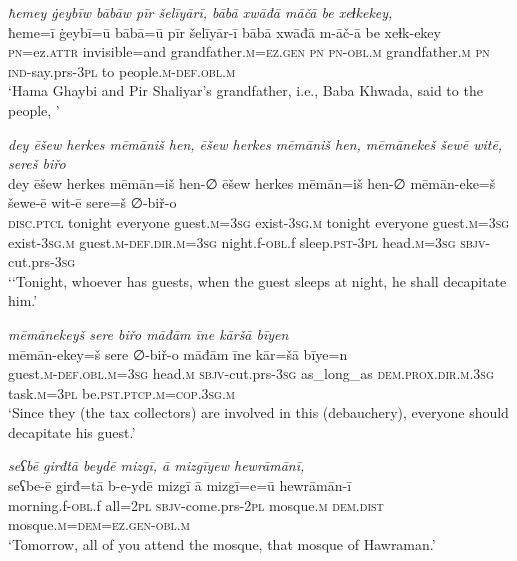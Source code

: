 \ea \label{BP.51}
\textit{ħemey ġeybīw bābāw pīr šelīyārī, bābā xwāđā māčā be xeɫkekey,} \\ 
\gll ħeme=ī ġeybī=ū bābā=ū pīr šelīyār-ī bābā xwāđā m-āč-ā be xeɫk-ekey \\ 
 \textsc{pn}=ez.\textsc{attr} invisible=and grandfather\textsc{.m}\textsc{=ez.gen} \textsc{pn} \textsc{pn}\textsc{-obl}\textsc{.m} grandfather\textsc{.m} \textsc{pn} \textsc{ind-}say.prs\textsc{-3pl} to people\textsc{.m}\textsc{-def}\textsc{.obl}\textsc{.m} \\ 
\glt `Hama Ghaybi and Pir Shaliyar’s grandfather, i.e., Baba Khwada, said to the people, '
\z 
 
\ea \label{BP.52}
\textit{dey ēšew herkes mēmāniš hen, ēšew herkes mēmāniš hen, mēmānekeš šewē witē, sereš biřo} \\ 
\gll dey ēšew herkes mēmān=iš hen-∅ ēšew herkes mēmān=iš hen-∅ mēmān-eke=š šewe-ē wit-ē sere=š ∅-biř-o \\ 
 \textsc{disc.ptcl} tonight everyone guest\textsc{.m}\textsc{=3sg} exist\textsc{-3sg}\textsc{.m} tonight everyone guest\textsc{.m}\textsc{=3sg} exist\textsc{-3sg}\textsc{.m} guest\textsc{.m}\textsc{-def}\textsc{.dir}\textsc{.m}\textsc{=3sg} night.f\textsc{-obl}.f sleep\textsc{.pst}\textsc{-3pl} head\textsc{.m}\textsc{=3sg} \textsc{sbjv-}cut.prs\textsc{-3sg} \\ 
\glt `‘Tonight, whoever has guests, when the guest sleeps at night, he shall decapitate him.'
\z 
 
\ea \label{BP.53}
\textit{mēmānekeyš sere biřo māđām īne kāršā bīyen} \\ 
\gll mēmān-ekey=š sere ∅-biř-o māđām īne kār=šā bīye=n \\ 
 guest\textsc{.m}\textsc{-def}\textsc{.obl}\textsc{.m}\textsc{=3sg} head\textsc{.m} \textsc{sbjv-}cut.prs\textsc{-3sg} as\_long\_as \textsc{dem.prox}\textsc{.dir}\textsc{.m}\textsc{.3sg} task\textsc{.m}\textsc{=3pl} be\textsc{.pst}\textsc{.ptcp}\textsc{.m}\textsc{=cop}\textsc{.3sg}\textsc{.m} \\ 
\glt `Since they (the tax collectors) are involved in this (debauchery), everyone should decapitate his guest.'
\z 
 
\ea \label{BP.54}
\textit{seʕbē girđtā beydē mizgī, ā mizgīyew hewrāmānī,} \\ 
\gll seʕbe-ē girđ=tā b-e-ydē mizgī ā mizgī=e=ū hewrāmān-ī \\ 
 morning.f\textsc{-obl}.f all=\textsc{2pl} \textsc{sbjv-}come.prs-\textsc{2pl} mosque\textsc{.m} \textsc{dem.dist} mosque\textsc{.m}\textsc{=dem}\textsc{=ez.gen}\textsc{-obl}\textsc{.m} \\ 
\glt `Tomorrow, all of you attend the mosque, that mosque of Hawraman.'
\z 
 
